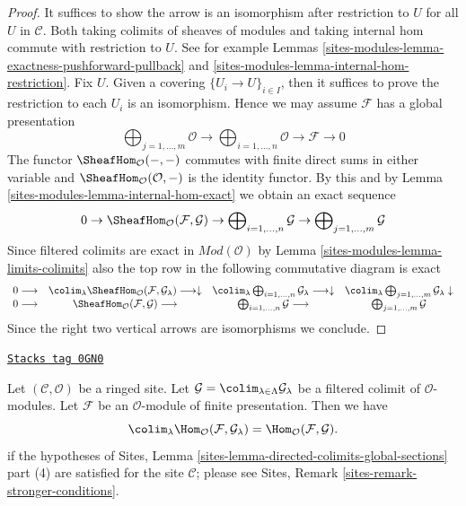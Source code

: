 \begin{proof}
It suffices to show the arrow is an isomorphism after restriction to $U$
for all $U$ in $\mathcal{C}$. Both taking colimits of sheaves of
modules and taking internal hom commute with restriction to $U$.
See for example Lemmas \ref{sites-modules-lemma-exactness-pushforward-pullback} and
\ref{sites-modules-lemma-internal-hom-restriction}. Fix $U$. Given a covering
$\{U_i \to U\}_{i \in I}$, then it suffices to prove the restriction
to each $U_i$ is an isomorphism. Hence we may assume
$\mathcal{F}$ has a global presentation
$$
\bigoplus\nolimits_{j = 1, \ldots, m}
\mathcal{O}
\longrightarrow
\bigoplus\nolimits_{i = 1, \ldots, n}
\mathcal{O}
\to
\mathcal{F}
\to
0
$$
The functor $\SheafHom_\mathcal{O}(-, -)$ commutes with finite direct sums
in either variable and $\SheafHom_\mathcal{O}(\mathcal{O}, -)$
is the identity functor. By this and by Lemma \ref{sites-modules-lemma-internal-hom-exact}
we obtain an exact sequence
$$
0 \to
\SheafHom_\mathcal{O}(\mathcal{F}, \mathcal{G}) \to
\bigoplus\nolimits_{i = 1, \ldots, n} \mathcal{G} \to
\bigoplus\nolimits_{j = 1, \ldots, m} \mathcal{G}
$$
Since filtered colimits are exact in $\textit{Mod}(\mathcal{O})$
by Lemma \ref{sites-modules-lemma-limits-colimits}
also the top row in the following commutative diagram is exact
$$
\begin{array}{cccc}0 \longrightarrow & \colim_\lambda \SheafHom_\mathcal{O}(\mathcal{F}, \mathcal{G}_\lambda)
\longrightarrow\downarrow & \colim_\lambda \bigoplus\nolimits_{i = 1, \ldots, n} \mathcal{G}_\lambda
\longrightarrow\downarrow & \colim_\lambda \bigoplus\nolimits_{j = 1, \ldots, m} \mathcal{G}_\lambda
\downarrow \\ 0 \longrightarrow & \SheafHom_\mathcal{O}(\mathcal{F}, \mathcal{G}) \longrightarrow & \bigoplus\nolimits_{i = 1, \ldots, n} \mathcal{G} \longrightarrow & \bigoplus\nolimits_{j = 1, \ldots, m} \mathcal{G}\end{array}
$$
Since the right two vertical arrows are isomorphisms we conclude.
\end{proof}

\begin{lemma}
\label{sites-modules-lemma-finite-presentation-quasi-compact-colimit}
\href{https://stacks.math.columbia.edu/tag/0GN0}{\texttt{Stacks tag 0GN0}}

Let $(\mathcal{C}, \mathcal{O})$ be a ringed site.
Let $\mathcal{G} = \colim_{\lambda \in \Lambda} \mathcal{G}_\lambda$
be a filtered colimit of $\mathcal{O}$-modules.
Let $\mathcal{F}$ be an $\mathcal{O}$-module of finite presentation.
Then we have
$$
\colim_\lambda \Hom_\mathcal{O}(\mathcal{F}, \mathcal{G}_\lambda)
=
\Hom_\mathcal{O}(\mathcal{F}, \mathcal{G}).
$$
if the hypotheses of
Sites, Lemma \ref{sites-lemma-directed-colimits-global-sections} part (4)
are satisfied for the site $\mathcal{C}$; please see
Sites, Remark \ref{sites-remark-stronger-conditions}.
\end{lemma}

